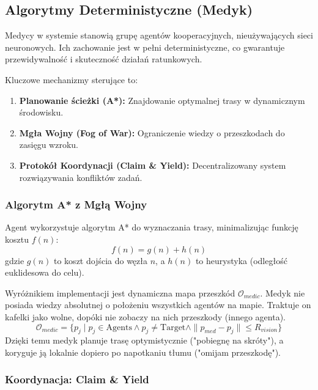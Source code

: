 \documentclass[12pt,a4paper]{article}
\begin{document}
\subsection{Algorytmy Deterministyczne (Medyk)}

Medycy w systemie stanowią grupę agentów kooperacyjnych, nieużywających sieci
neuronowych. Ich zachowanie jest w pełni deterministyczne, co gwarantuje
przewidywalność i skuteczność działań ratunkowych.

Kluczowe mechanizmy sterujące to:
\begin{enumerate}
	\item \textbf{Planowanie ścieżki (A*):} Znajdowanie optymalnej trasy w dynamicznym środowisku.
	\item \textbf{Mgła Wojny (Fog of War):} Ograniczenie wiedzy o przeszkodach do zasięgu wzroku.
	\item \textbf{Protokół Koordynacji (Claim \& Yield):} Decentralizowany system rozwiązywania konfliktów zadań.
\end{enumerate}

\subsubsection{Algorytm A* z Mgłą Wojny}

Agent wykorzystuje algorytm A* do wyznaczania trasy, minimalizując funkcję
kosztu $f(n)$:
\begin{equation}
	f(n) = g(n) + h(n)
\end{equation}
gdzie $g(n)$ to koszt dojścia do węzła $n$, a $h(n)$ to heurystyka (odległość euklidesowa do celu).

Wyróżnikiem implementacji jest dynamiczna mapa przeszkód $\mathcal{O}_{medic}$.
Medyk nie posiada wiedzy absolutnej o położeniu wszystkich agentów na mapie.
Traktuje on kafelki jako wolne, dopóki nie zobaczy na nich przeszkody (innego
agenta).
\begin{equation}
	\mathcal{O}_{medic} = \{ p_j \mid p_j \in \text{Agents} \land p_j \ne \text{Target} \land \|p_{med} - p_j\| \le R_{vision} \}
\end{equation}
Dzięki temu medyk planuje trasę optymistycznie ("pobiegnę na skróty"), a koryguje ją lokalnie dopiero po napotkaniu tłumu ("omijam przeszkodę").

\subsubsection{Koordynacja: Claim \& Yield}
\end{document}
